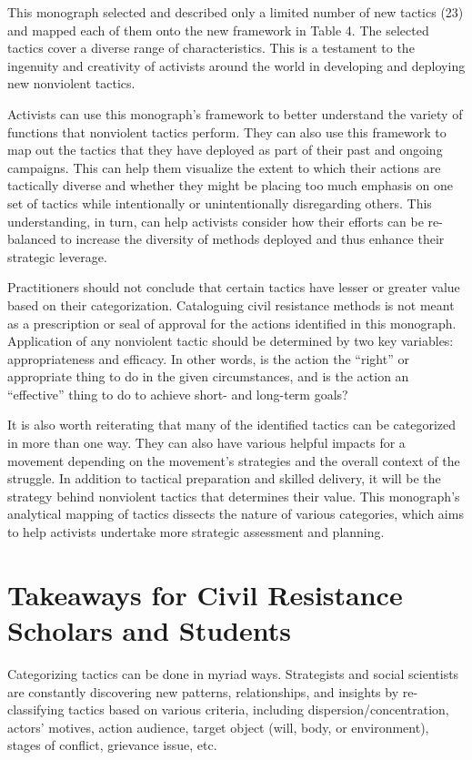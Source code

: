 \documentclass[twoside,a4paper,12pt,fleqn,openany]{extbook}
\begin{document}
This monograph selected and described only a limited number of new tactics (23) and mapped each of them onto the new framework in Table 4. The selected tactics cover a diverse range of characteristics. This is a testament to the ingenuity and creativity of activists around
the world in developing and deploying new nonviolent tactics.

Activists can use this monograph’s framework to better understand the variety of functions that nonviolent tactics perform. They can also use this framework to map out the tactics that they have deployed as part of their past and ongoing campaigns. This can help them visualize the extent to which their actions are tactically diverse and whether they might be placing too much emphasis on one set of tactics while intentionally or unintentionally disregarding others. This understanding, in turn, can help activists consider how their efforts can be re-balanced to increase the diversity of methods deployed and thus enhance their strategic leverage.

Practitioners should not conclude that certain tactics have lesser or greater value based on their categorization. Cataloguing civil resistance methods is not meant as a prescription or seal of approval for the actions identified in this monograph. Application of any nonviolent tactic should be determined by two key variables: appropriateness and efficacy. In other words, is the action the “right” or appropriate thing to do in the given circumstances, and is the action an “effective” thing to do to achieve short- and long-term goals?

It is also worth reiterating that many of the identified tactics can be categorized in more than one way. They can also have various helpful impacts for a movement depending on the movement’s strategies and the overall context of the struggle. In addition to tactical preparation and skilled delivery, it will be the strategy behind nonviolent tactics that determines their value. This monograph’s analytical mapping of tactics dissects the nature of various categories, which aims to help activists undertake more strategic assessment and planning.

\section*{Takeaways for Civil Resistance Scholars and Students}

Categorizing tactics can be done in myriad ways. Strategists and social scientists are constantly discovering new patterns, relationships, and insights by re-classifying tactics based on various criteria, including dispersion/concentration, actors’ motives, action audience, target object (will, body, or environment), stages of conflict, grievance issue, etc.
\end{document}
